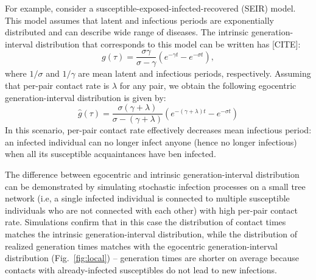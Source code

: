 \documentclass[12pt]{article}
\newcommand{\fref}[1]{Fig.~\ref{fig:#1}}
\begin{document}
For example, consider a susceptible-exposed-infected-recovered (SEIR) model.
This model assumes that latent and infectious periods are exponentially distributed and can describe wide range of diseases.
The intrinsic generation-interval distribution that corresponds to this model can be written has [CITE]:
\begin{equation}
g(\tau) = \frac{\sigma \gamma}{\sigma - \gamma} \left(e^{-\gamma t} - e^{-\sigma t}\right),
\end{equation}
where $1/\sigma$ and $1/\gamma$ are mean latent and infectious periods, respectively.
Assuming that per-pair contact rate is $\lambda$ for any pair, we obtain the following egocentric generation-interval distribution is given by:
\begin{equation}
\hat{g}(\tau) = \frac{\sigma (\gamma + \lambda)}{\sigma - (\gamma + \lambda)} \left(e^{-(\gamma + \lambda)t} - e^{-\sigma t}\right)
\end{equation}
In this scenario, per-pair contact rate effectively decreases mean infectious period: an infected individual can no longer infect anyone (hence no longer infectious) when all its susceptible acquaintances have ben infected.

The difference between egocentric and intrinsic generation-interval distribution can be demonstrated by simulating stochastic infection processes on a small tree network (i.e, a single infected individual is connected to multiple susceptible individuals who are not connected with each other) with high per-pair contact rate.
Simulations confirm that in this case the distribution of contact times matches the intrinsic generation-interval distribution, while the distribution of realized generation times matches with the egocentric generation-interval distribution (\fref{local}) -- generation times are shorter on average because contacts with already-infected susceptibles do not lead to new infections.
\end{document}
